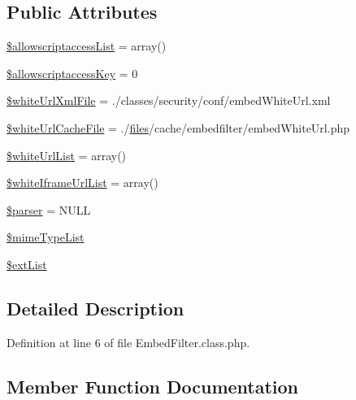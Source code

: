 \subsection*{Public Attributes}
\begin{DoxyCompactItemize}
\item 
\hyperlink{classEmbedFilter_a09ba67f124ae7f35412a1bb11f2419c7}{\$allowscriptaccess\+List} = array()
\item 
\hyperlink{classEmbedFilter_a643732fe7a32d323e2123bd1ef9f3bdb}{\$allowscriptaccess\+Key} = 0
\item 
\hyperlink{classEmbedFilter_aad143e16d225c65d096f44b325744c89}{\$white\+Url\+Xml\+File} = \textquotesingle{}./classes/security/conf/embed\+White\+Url.\+xml\textquotesingle{}
\item 
\hyperlink{classEmbedFilter_a2c04bd8059ab27b14923923317ad0756}{\$white\+Url\+Cache\+File} = \textquotesingle{}./\hyperlink{popup_8min_8js_a0742cac2750bccc2d88ac080fb9daa22}{files}/cache/embedfilter/embed\+White\+Url.\+php\textquotesingle{}
\item 
\hyperlink{classEmbedFilter_a3c991ef8c125e62213cc5c686712be8f}{\$white\+Url\+List} = array()
\item 
\hyperlink{classEmbedFilter_ad1a091dd6db8753f50b269bac16e2868}{\$white\+Iframe\+Url\+List} = array()
\item 
\hyperlink{classEmbedFilter_aae7e65cd7dd322d86081df16add1a5ed}{\$parser} = N\+U\+LL
\item 
\hyperlink{classEmbedFilter_a6bbd35ce27aaa1eda9600f8ee78b9b34}{\$mime\+Type\+List}
\item 
\hyperlink{classEmbedFilter_ae4ef00ed26254ca247a83d91b021a928}{\$ext\+List}
\end{DoxyCompactItemize}


\subsection{Detailed Description}


Definition at line 6 of file Embed\+Filter.\+class.\+php.



\subsection{Member Function Documentation}
